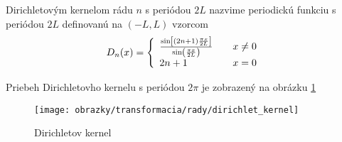 \begin{definicia}
Dirichletovým kernelom  rádu $n$ s periódou $2L$ nazvime periodickú funkciu
s periódou $2L$ definovanú na $(-L,L)$ vzorcom
\begin{equation*}
    D_n(x) = \left\{
        \begin{array}{l l}
            \frac{\sin\left[(2n+1) \frac{\pi x}{2 L}\right]}{
            \sin\left(\frac{\pi x}{2 L}\right)} \quad& x\not=0 \\
            2n+1 \quad& x=0
        \end{array}
    \right.
\end{equation*}
\end{definicia}

Priebeh Dirichletovho kernelu s periódou $2\pi$ je zobrazený na
obrázku
\ref{fig:dirichlet_kernel}

\begin{figure}[htp]
    \centering
    \texttt{[image: obrazky/transformacia/rady/dirichlet\_kernel]}
    \caption{Dirichletov kernel}
    \label{fig:dirichlet_kernel}
\end{figure}

